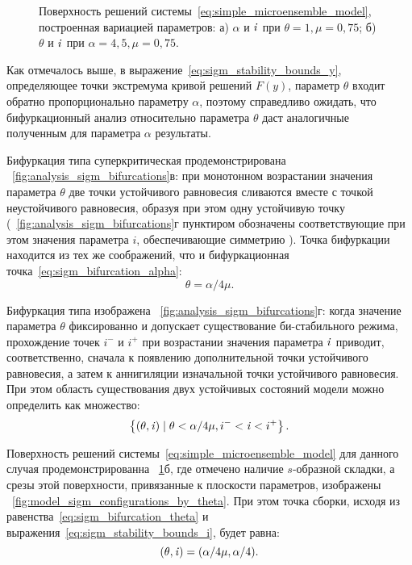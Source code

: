 \begin{figure}[t]
    \caption{Поверхность решений системы~\eqref{eq:simple_microensemble_model}, построенная вариацией параметров: а) $\alpha$ и $\mathit{i}$ при $\theta = 1, \mu = 0,75$; б) $\theta$ и $\mathit{i}$ при $\alpha = 4,5, \mu = 0,75$.}
    \label{fig:analysis_sigm_solution_surface}
\end{figure}

Как отмечалось выше, в выражение~\eqref{eq:sigm_stability_bounds_y}, определяющее точки экстремума кривой решений $F(y)$, параметр $\theta$ входит обратно пропорционально параметру $\alpha$, поэтому справедливо ожидать, что бифуркационный анализ относительно параметра $\theta$ даст аналогичные полученным для параметра $\alpha$ результаты.

Бифуркация типа суперкритическая  продемонстрирована \onfigure~\ref{fig:analysis_sigm_bifurcations}в: при монотонном возрастании значения параметра $\theta$ две точки устойчивого равновесия сливаются вместе с точкой неустойчивого равновесия, образуя при этом одну устойчивую точку (\onfigure~\ref{fig:analysis_sigm_bifurcations}г пунктиром обозначены соответствующие при этом значения параметра $i$, обеспечивающие симметрию ). Точка бифуркации находится из тех же соображений, что и бифуркационная точка~\eqref{eq:sigm_bifurcation_alpha}:
\begin{equation}
    \label{eq:sigm_bifurcation_theta}
    \theta =  \alpha / 4 \mu.
\end{equation}

Бифуркация типа  изображена \onfigure~\ref{fig:analysis_sigm_bifurcations}г: когда значение параметра $\theta$ фиксированно и допускает существование би-стабильного режима, прохождение точек $i^{-}$ и $i^{+}$ при возрастании значения параметра $\mathit{i}$ приводит, соответственно, сначала к появлению дополнительной точки устойчивого равновесия, а затем к аннигиляции изначальной точки устойчивого равновесия. При этом область существования двух устойчивых состояний модели можно определить как множество: 
\begin{equation}
    \nonumber
    \left\{(\theta, \mathit{i}) \mid \theta < \alpha / 4 \mu, i^{-} < \mathit{i} < i^{+}\right\}.
\end{equation}

Поверхность решений системы~\eqref{eq:simple_microensemble_model} для данного случая продемонстрированна \onfigure~\ref{fig:analysis_sigm_solution_surface}б, где отмечено наличие $s$-образной складки, а срезы этой поверхности, привязанные к плоскости параметров, изображены \onfigure~\ref{fig:model_sigm_configurations_by_theta}. При этом точка сборки, исходя из равенства~\eqref{eq:sigm_bifurcation_theta} и выражения~\eqref{eq:sigm_stability_bounds_i}, будет равна:
\begin{equation}
    \nonumber
    (\theta, \mathit{i}) = (\alpha / 4 \mu, \alpha / 4).
\end{equation}

